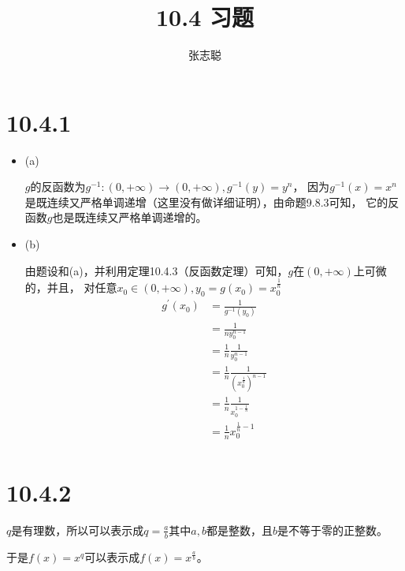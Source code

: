 \documentclass{article}
\begin{document}
\title{10.4 习题}
\author{张志聪}
\maketitle

\section*{10.4.1}

\begin{itemize}
  \item (a)

        $g$的反函数为$g^{-1}: (0, +\infty) \to (0, +\infty),g^{-1}(y) = y^n$，
        因为$g^{-1}(x) = x^n$是既连续又严格单调递增（这里没有做详细证明），由命题9.8.3可知，
        它的反函数$g$也是既连续又严格单调递增的。

  \item (b)

        由题设和(a)，并利用定理10.4.3（反函数定理）可知，$g$在$(0, +\infty)$上可微的，并且，
        对任意$x_0 \in (0, +\infty), y_0 = g(x_0) = x_0^{\frac{1}{n}}$
        \begin{align*}
          g^\prime(x_0) & = \frac{1}{g^{-1}(y_0)}                          \\
                        & = \frac{1}{ny_0^{n-1}}                           \\
                        & = \frac{1}{n}\frac{1}{y_0^{n-1}}                 \\
                        & = \frac{1}{n}\frac{1}{(x_0^{\frac{1}{n}})^{n-1}} \\
                        & = \frac{1}{n}\frac{1}{x_0^{1 - \frac{1}{n}}}     \\
                        & = \frac{1}{n}x_0^{\frac{1}{n} - 1}               \\
        \end{align*}
\end{itemize}

\section*{10.4.2}

$q$是有理数，所以可以表示成$q = \frac{a}{b}$其中$a, b$都是整数，且$b$是不等于零的正整数。

于是$f(x) = x^q$可以表示成$f(x) = x^{\frac{a}{b}}$。
\end{document}
